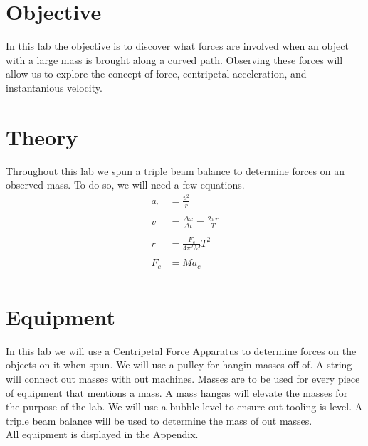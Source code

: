 \documentclass[12pt]{report}
\newcommand{\eqname}[1]{\tag*{#1}}%
\begin{document}

\newpage
\begin{flushleft}

\begin{multicols}{2}

\section{Objective}
In this lab the objective is to discover what forces are involved when an
object with a large mass is brought along a curved path. Observing these forces
will allow us to explore the concept of force, centripetal acceleration, and
instantanious velocity.
\section{Theory}
Throughout this lab we spun a triple beam balance to determine forces on an
observed mass. To do so, we will need a few equations.
\begin{align}
  a_c &= \frac{v^2}{r} \label{centripetal_acceleration} \\ \eqname{Centripetal Acceleration} \\
  v &= \frac{\Delta x}{\Delta t} = \frac{2\pi r}{T} \label{velocity} \\ \eqname{Velocity} \\
  r &= \frac{F_c}{4\pi^2M}T^2 \label{radius} \\ \eqname{Radius of Rotation} \\
  F_c &= Ma_c \label{centripetal_force} \\ \eqname{Centripetal Force}
\end{align}
\section{Equipment}
In this lab we will use a Centripetal Force Apparatus to determine forces on the objects on it when spun. We will use a pulley for hangin masses off of. A string will connect out masses with out machines.
Masses are to be used for every piece of equipment that mentions a mass. A mass hangas will elevate the masses for the purpose of the lab. We will use a bubble level to ensure out tooling is level. A triple beam balance will be used to determine the mass of out masses.\\ All equipment is  displayed in the Appendix.

\end{multicols}
\end{flushleft}
\end{document}
